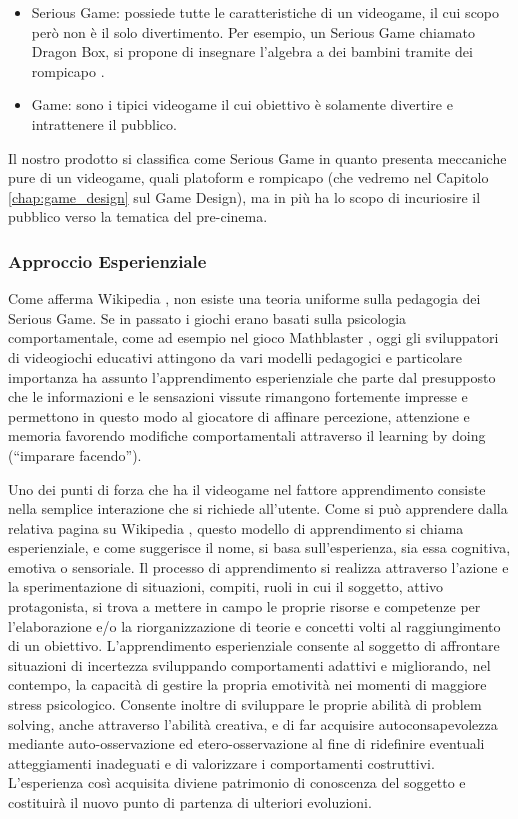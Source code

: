 \begin{itemize}
\item Serious Game: possiede tutte le caratteristiche di un videogame, il cui scopo però non è il solo divertimento. Per esempio, un Serious Game chiamato Dragon Box, si propone di insegnare l'algebra a dei bambini tramite dei rompicapo \cite{dragonboxhome}.


\item Game: sono i tipici videogame il cui obiettivo è solamente divertire e intrattenere il pubblico.
\end{itemize}

Il nostro prodotto si classifica come Serious Game in quanto presenta meccaniche pure di un videogame, quali platoform e rompicapo (che vedremo nel Capitolo \ref{chap:game_design} sul Game Design), ma in più ha lo scopo di incuriosire il pubblico verso la tematica del pre-cinema.

\newpage

\subsubsection{Approccio Esperienziale}
\label{sec:seriousgameesp}

Come afferma Wikipedia \cite{wikiseriousgames}, non esiste una teoria uniforme sulla pedagogia dei Serious Game. Se in passato i giochi erano basati sulla psicologia comportamentale, come ad esempio nel gioco Mathblaster  \cite{mathblaster}, 
oggi gli sviluppatori di videogiochi educativi attingono da vari modelli pedagogici e particolare importanza ha assunto l'apprendimento esperienziale che parte dal presupposto che le informazioni 
e le sensazioni vissute rimangono fortemente impresse e permettono in questo modo al giocatore di affinare percezione, attenzione e memoria favorendo modifiche comportamentali attraverso il learning by doing (``imparare facendo'').

Uno dei punti di forza che ha il videogame nel fattore apprendimento consiste nella semplice interazione che si richiede all'utente. Come si può apprendere dalla relativa pagina su Wikipedia \cite{apprendimentoesperienziale}, questo modello di apprendimento si chiama esperienziale, e come suggerisce il nome, si basa sull'esperienza, sia essa cognitiva, emotiva o sensoriale. Il processo di apprendimento si realizza attraverso l'azione e la sperimentazione di situazioni, compiti, ruoli in cui il soggetto, attivo protagonista, si trova a mettere in campo le proprie risorse e competenze per l'elaborazione e/o la riorganizzazione di teorie e concetti volti al raggiungimento di un obiettivo. L'apprendimento esperienziale consente al soggetto di affrontare situazioni di incertezza sviluppando comportamenti adattivi e migliorando, nel contempo, la capacità di gestire la propria emotività nei momenti di maggiore stress psicologico. Consente inoltre di sviluppare le proprie abilità di problem solving, anche attraverso l'abilità creativa, e di far acquisire autoconsapevolezza mediante auto-osservazione ed etero-osservazione al fine di ridefinire eventuali atteggiamenti inadeguati e di valorizzare i comportamenti costruttivi. L'esperienza così acquisita diviene patrimonio di conoscenza del soggetto e costituirà il nuovo punto di partenza di ulteriori evoluzioni.

